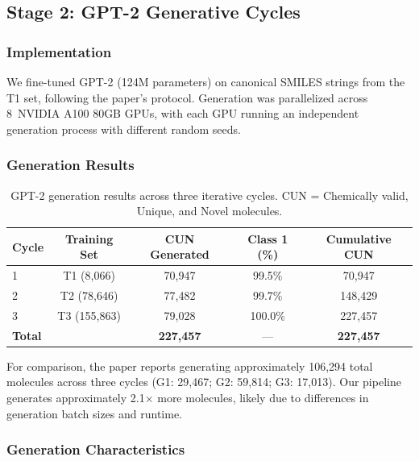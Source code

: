 \documentclass[11pt,a4paper]{article}
\begin{document}
\subsection{Stage 2: GPT-2 Generative Cycles}
\label{sec:generation}

\subsubsection{Implementation}

We fine-tuned GPT-2 (124M parameters) on canonical SMILES strings from the T1 set, following the paper's protocol. Generation was parallelized across 8~NVIDIA A100 80GB GPUs, with each GPU running an independent generation process with different random seeds.

\subsubsection{Generation Results}

\begin{table}[H]
\centering
\caption{GPT-2 generation results across three iterative cycles. CUN = Chemically valid, Unique, and Novel molecules.}
\label{tab:generation}
\begin{tabular}{lcccc}
\toprule
Cycle & Training Set & CUN Generated & Class 1 (\%) & Cumulative CUN \\
\midrule
1 & T1 (8,066) & 70,947 & 99.5\% & 70,947 \\
2 & T2 (78,646) & 77,482 & 99.7\% & 148,429 \\
3 & T3 (155,863) & 79,028 & 100.0\% & 227,457 \\
\midrule
\multicolumn{2}{l}{\textbf{Total}} & \textbf{227,457} & --- & \textbf{227,457} \\
\bottomrule
\end{tabular}
\end{table}

For comparison, the paper reports generating approximately 106,294 total molecules across three cycles (G1: 29,467; G2: 59,814; G3: 17,013). Our pipeline generates approximately 2.1$\times$ more molecules, likely due to differences in generation batch sizes and runtime.

\subsubsection{Generation Characteristics}
\end{document}
